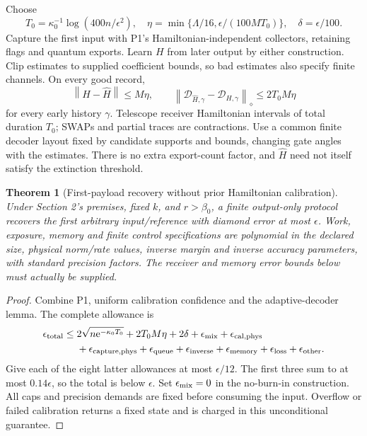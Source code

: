 \documentclass[11pt]{article}
\newtheorem{theorem}{Theorem}
\newcommand{\norm}[1]{\left\lVert #1\right\rVert}
\newcommand{\cD}{\mathcal D}
\newcommand{\ee}{\mathrm e}
\begin{document}
Choose
\[
T_0=\kappa_0^{-1}\log(400n/\epsilon^2),\quad
\eta=\min\{\Lambda/16,\epsilon/(100MT_0)\},\quad
\delta=\epsilon/100.
\]
Capture the first input with P1's Hamiltonian-independent collectors,
retaining flags and quantum exports. Learn \(H\) from later output by
either construction. Clip estimates to supplied coefficient bounds, so
bad estimates also specify finite channels. On every good record,
\[
\norm{H-\widehat H}\le M\eta,\qquad
\norm{\cD_{\widehat H,\gamma}-\cD_{H,\gamma}}_\diamond
\le2T_0M\eta
\]
for every early history \(\gamma\). Telescope receiver Hamiltonian intervals
of total duration \(T_0\); SWAPs and partial traces are contractions.
Use a common finite decoder layout fixed by candidate supports and bounds,
changing gate angles with the estimates. There is no extra export-count
factor, and \(\widehat H\) need not itself satisfy the extinction threshold.

\begin{theorem}[First-payload recovery without prior Hamiltonian calibration]
Under Section 2's premises, fixed \(k\), and \(r>\beta_0\), a finite
output-only protocol recovers the first arbitrary input/reference with
diamond error at most \(\epsilon\). Work, exposure, memory and finite
control specifications are polynomial in the declared size, physical
norm/rate values, inverse margin and inverse accuracy parameters, with
standard precision factors. The receiver and memory error bounds below
must actually be supplied.
\end{theorem}
\begin{proof}
Combine P1, uniform calibration confidence and the adaptive-decoder lemma.
The complete allowance is
\begin{align}
\epsilon_{\rm total}\le{}&
2\sqrt{n\ee^{-\kappa_0T_0}}+2T_0M\eta+2\delta
+\epsilon_{\rm mix}+\epsilon_{\rm cal,phys}\nonumber\\
&+\epsilon_{\rm capture,phys}+\epsilon_{\rm queue}
+\epsilon_{\rm inverse}+\epsilon_{\rm memory}
+\epsilon_{\rm loss}+\epsilon_{\rm other}.
\label{eq:ledger}
\end{align}
Give each of the eight latter allowances at most \(\epsilon/12\).
The first three sum to at most \(0.14\epsilon\), so the total is below
\(\epsilon\). Set \(\epsilon_{\rm mix}=0\) in the no-burn-in construction.
All caps and precision demands are fixed before consuming the input.
Overflow or failed calibration returns a fixed state and is charged
in this unconditional guarantee.
\end{proof}
\end{document}
